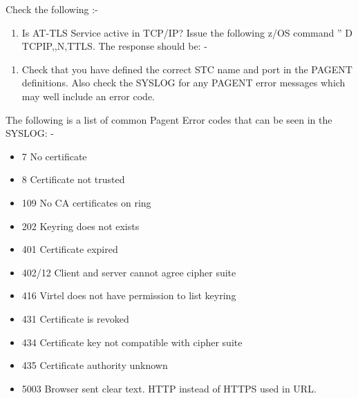 \documentclass[letterpaper,10pt,english]{sphinxmanual}
\begin{document}
Check the following :-
\begin{enumerate}
\def\theenumi{\arabic{enumi}}
\def\labelenumi{\theenumi .}
\makeatletter\def\p@enumii{\p@enumi \theenumi .}\makeatother
\item {} 
Is AT-TLS Service active in TCP/IP? Issue the following z/OS command ” D TCPIP,,N,TTLS. The response should be: -

\end{enumerate}

\begin{sphinxVerbatim}[commandchars=\\\{\}]
     
   
  
    
   
\end{sphinxVerbatim}
\begin{enumerate}
\def\theenumi{\arabic{enumi}}
\def\labelenumi{\theenumi .}
\makeatletter\def\p@enumii{\p@enumi \theenumi .}\makeatother
\setcounter{enumi}{1}
\item {} 
Check that you have defined the correct STC name and port in the PAGENT definitions. Also check the SYSLOG for any PAGENT error messages which may well include an error code.

\end{enumerate}

The following is a list of common Pagent Error codes that can be seen in the SYSLOG: -
\begin{itemize}
\item {} 
7      No certificate

\item {} 
8      Certificate not trusted

\item {} 
109    No CA certificates on ring

\item {} 
202    Keyring does not exists

\item {} 
401    Certificate expired

\item {} 
402/12 Client and server cannot agree cipher suite

\item {} 
416    Virtel does not have permission to list keyring

\item {} 
431    Certificate is revoked

\item {} 
434    Certificate key not compatible with cipher suite

\item {} 
435    Certificate authority unknown

\item {} 
5003   Browser sent clear text. HTTP instead of HTTPS used in URL.

\end{itemize}
\end{document}
